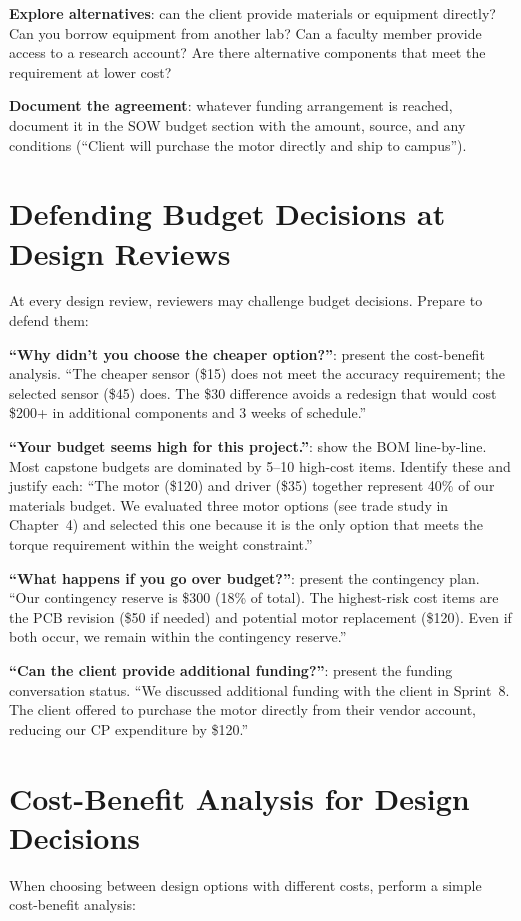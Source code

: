\textbf{Explore alternatives}: can the client provide materials or equipment directly? Can you borrow equipment from another lab? Can a faculty member provide access to a research account? Are there alternative components that meet the requirement at lower cost?

\textbf{Document the agreement}: whatever funding arrangement is reached, document it in the SOW budget section with the amount, source, and any conditions (``Client will purchase the motor directly and ship to campus'').



\section{Defending Budget Decisions at Design Reviews}
At every design review, reviewers may challenge budget decisions. Prepare to defend them:

\textbf{``Why didn't you choose the cheaper option?''}: present the cost-benefit analysis. ``The cheaper sensor (\$15) does not meet the accuracy requirement; the selected sensor (\$45) does. The \$30 difference avoids a redesign that would cost \$200+ in additional components and 3 weeks of schedule.''

\textbf{``Your budget seems high for this project.''}: show the BOM line-by-line. Most capstone budgets are dominated by 5--10 high-cost items. Identify these and justify each: ``The motor (\$120) and driver (\$35) together represent 40\% of our materials budget. We evaluated three motor options (see trade study in Chapter~4) and selected this one because it is the only option that meets the torque requirement within the weight constraint.''

\textbf{``What happens if you go over budget?''}: present the contingency plan. ``Our contingency reserve is \$300 (18\% of total). The highest-risk cost items are the PCB revision (\$50 if needed) and potential motor replacement (\$120). Even if both occur, we remain within the contingency reserve.''

\textbf{``Can the client provide additional funding?''}: present the funding conversation status. ``We discussed additional funding with the client in Sprint~8. The client offered to purchase the motor directly from their vendor account, reducing our CP expenditure by \$120.''

\section{Cost-Benefit Analysis for Design Decisions}
When choosing between design options with different costs, perform a simple cost-benefit analysis:

